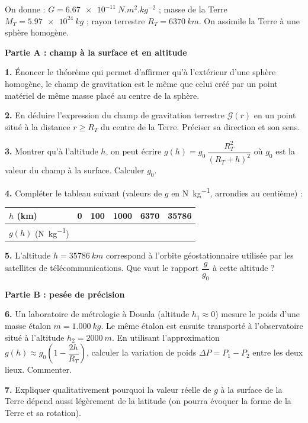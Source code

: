 \documentclass[11pt]{article}
\begin{document}
\begin{exercice}
On donne : $G = \SI{6,67e-11}{N.m^2.kg^{-2}}$ ; masse de la Terre $M_T = \SI{5,97e24}{kg}$ ; rayon terrestre $R_T = \SI{6370}{km}$. On assimile la Terre à une sphère homogène.

\textbf{Partie A : champ à la surface et en altitude}

\textbf{1.} Énoncer le théorème qui permet d'affirmer qu'à l'extérieur d'une sphère homogène, le champ de gravitation est le même que celui créé par un point matériel de même masse placé au centre de la sphère.

\textbf{2.} En déduire l'expression du champ de gravitation terrestre $\mathcal{G}(r)$ en un point situé à la distance $r \geq R_T$ du centre de la Terre. Préciser sa direction et son sens.

\textbf{3.} Montrer qu'à l'altitude $h$, on peut écrire $g(h) = g_0\,\dfrac{R_T^2}{(R_T + h)^2}$ où $g_0$ est la valeur du champ à la surface. Calculer $g_0$.

\textbf{4.} Compléter le tableau suivant (valeurs de $g$ en \si{N.kg^{-1}}, arrondies au centième) :

\begin{center}
\begin{tabularx}{\linewidth}{|l|*{5}{X|}}
\hline
\rowcolor{popblueL}
$h$ (km) & 0 & 100 & 1000 & 6370 & 35786 \\
\hline
$g(h)$ (\si{N.kg^{-1}}) & & & & & \\
\hline
\end{tabularx}
\end{center}

\textbf{5.} L'altitude $h = \SI{35786}{km}$ correspond à l'orbite géostationnaire utilisée par les satellites de télécommunications. Que vaut le rapport $\dfrac{g}{g_0}$ à cette altitude ?

\textbf{Partie B : pesée de précision}

\textbf{6.} Un laboratoire de métrologie à Douala (altitude $h_1 \approx 0$) mesure le poids d'une masse étalon $m = \SI{1,000}{kg}$. Le même étalon est ensuite transporté à l'observatoire situé à l'altitude $h_2 = \SI{2000}{m}$. En utilisant l'approximation $g(h) \approx g_0\left(1 - \dfrac{2h}{R_T}\right)$, calculer la variation de poids $\Delta P = P_1 - P_2$ entre les deux lieux. Commenter.

\textbf{7.} Expliquer qualitativement pourquoi la valeur réelle de $g$ à la surface de la Terre dépend aussi légèrement de la latitude (on pourra évoquer la forme de la Terre et sa rotation).
\end{exercice}
\end{document}
